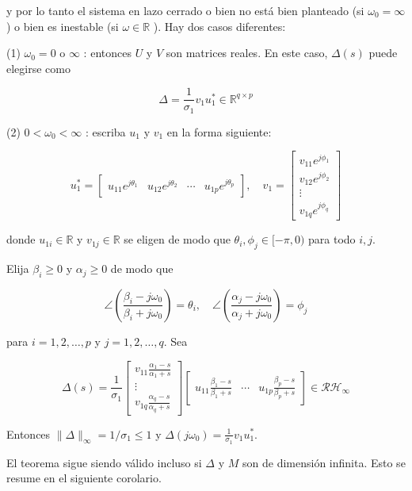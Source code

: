 y por lo tanto el sistema en lazo cerrado o bien no está bien planteado (si $\omega_{0}=\infty$ ) o bien es inestable (si $\omega \in \mathbb{R}$ ). Hay dos casos diferentes:

(1) $\omega_{0}=0$ o $\infty$ : entonces $U$ y $V$ son matrices reales. En este caso, $\Delta(s)$ puede elegirse como

$$
\Delta=\frac{1}{\sigma_{1}} v_{1} u_{1}^{*} \in \mathbb{R}^{q \times p}
$$

(2) $0<\omega_{0}<\infty$ : escriba $u_{1}$ y $v_{1}$ en la forma siguiente:

$$
u_{1}^{*}=\left[\begin{array}{llll}
u_{11} e^{j \theta_{1}} & u_{12} e^{j \theta_{2}} & \cdots & u_{1 p} e^{j \theta_{p}}
\end{array}\right], \quad v_{1}=\left[\begin{array}{c}
v_{11} e^{j \phi_{1}} \\
v_{12} e^{j \phi_{2}} \\
\vdots \\
v_{1 q} e^{j \phi_{q}}
\end{array}\right]
$$

donde $u_{1 i} \in \mathbb{R}$ y $v_{1 j} \in \mathbb{R}$ se eligen de modo que $\theta_{i}, \phi_{j} \in[-\pi, 0)$ para todo $i, j$.

Elija $\beta_{i} \geq 0$ y $\alpha_{j} \geq 0$ de modo que

$$
\angle\left(\frac{\beta_{i}-j \omega_{0}}{\beta_{i}+j \omega_{0}}\right)=\theta_{i}, \quad \angle\left(\frac{\alpha_{j}-j \omega_{0}}{\alpha_{j}+j \omega_{0}}\right)=\phi_{j}
$$

para $i=1,2, \ldots, p$ y $j=1,2, \ldots, q$. Sea

$$
\Delta(s)=\frac{1}{\sigma_{1}}\left[\begin{array}{c}
v_{11} \frac{\alpha_{1}-s}{\alpha_{1}+s} \\
\vdots \\
v_{1 q} \frac{\alpha_{q}-s}{\alpha_{q}+s}
\end{array}\right]\left[\begin{array}{lll}
u_{11} \frac{\beta_{1}-s}{\beta_{1}+s} & \cdots & u_{1 p} \frac{\beta_{p}-s}{\beta_{p}+s}
\end{array}\right] \in \mathcal{R} \mathcal{H}_{\infty}
$$

Entonces $\|\Delta\|_{\infty}=1 / \sigma_{1} \leq 1$ y $\Delta\left(j \omega_{0}\right)=\frac{1}{\sigma_{1}} v_{1} u_{1}^{*}$.

El teorema sigue siendo válido incluso si $\Delta$ y $M$ son de dimensión infinita. Esto se resume en el siguiente corolario.

